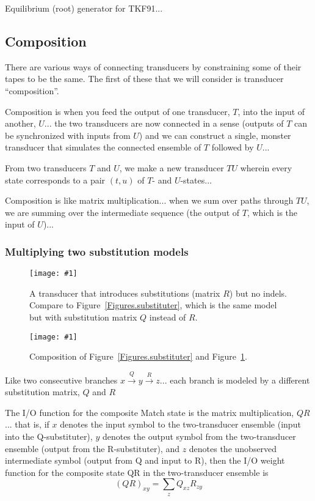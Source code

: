 \documentclass{article}
\newcommand{\figref}[1]{Figure~\ref{Figures.#1}}
\newcommand{\figlabel}[1]{\label{Figures.#1}}
\newcommand{\easyfig}[4]{
\begin{figure}
\texttt{[image: \#1]}
\caption{ \figlabel{#3} #4}
\end{figure}}
\newcommand{\pdffig}[2]{\easyfig{#1-fig.pdf}{}{#1}{#2}}
\begin{document}
Equilibrium (root) generator for TKF91...


\subsection{Composition}

There are various ways of connecting transducers by constraining some of their tapes to be the same.
The first of these that we will consider is transducer ``composition''.

Composition is when you feed the output of one transducer, $T$, into the input of another, $U$...
the two transducers are now connected in a sense (outputs of $T$ can be synchronized with inputs from $U$)
and we can construct a single, monster transducer that simulates the connected ensemble of $T$ followed by $U$...

From two transducers $T$ and $U$,
we make a new transducer $TU$
wherein every state corresponds to a pair $(t,u)$ of $T$- and $U$-states...

Composition is like matrix multiplication...
when we sum over paths through $TU$,
we are summing over the intermediate sequence
(the output of $T$, which is the input of $U$)...

\subsubsection{Multiplying two substitution models}

\pdffig{substituter2}{A transducer that introduces substitutions (matrix $R$) but no indels. Compare to \figref{substituter}, which is the same model but with substitution matrix $Q$ instead of $R$.}

\pdffig{substituter-substituter2}{Composition of \figref{substituter} and \figref{substituter2}.}

Like two consecutive branches $x \stackrel{Q}{\to} y \stackrel{R}{\to} z$...
each branch is modeled by a different substitution matrix, $Q$ and $R$

The I/O function for the composite Match state is the matrix multiplication, $QR$...
that is,
if $x$ denotes the input symbol to the two-transducer ensemble (input into the Q-substituter),
$y$ denotes the output symbol from the two-transducer ensemble (output from the R-substituter),
and $z$ denotes the unobserved intermediate symbol (output from Q and input to R),
then the I/O weight function for the composite state QR in the two-transducer ensemble is
\[
(QR)_{xy} = \sum_z Q_{xz} R_{zy}
\]
\end{document}
